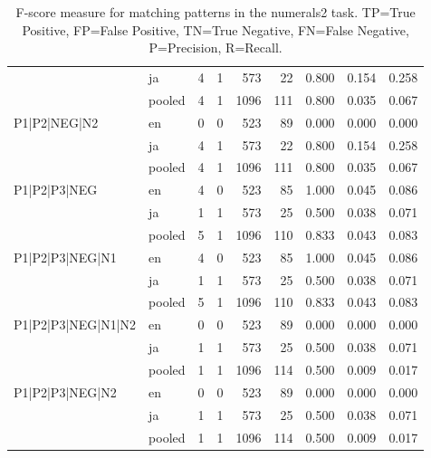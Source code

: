 \begin{table}[h!]
\begin{tabular}{llrrrrrrr}
 & ja & 4 & 1 & 573 & 22 & 0.800 & 0.154 & 0.258 \\
 & pooled & 4 & 1 & 1096 & 111 & 0.800 & 0.035 & 0.067 \\
\cline{1-9}
\multirow[t]{3}{*}{P1|P2|NEG|N2} & en & 0 & 0 & 523 & 89 & 0.000 & 0.000 & 0.000 \\
 & ja & 4 & 1 & 573 & 22 & 0.800 & 0.154 & 0.258 \\
 & pooled & 4 & 1 & 1096 & 111 & 0.800 & 0.035 & 0.067 \\
\cline{1-9}
\multirow[t]{3}{*}{P1|P2|P3|NEG} & en & 4 & 0 & 523 & 85 & 1.000 & 0.045 & 0.086 \\
 & ja & 1 & 1 & 573 & 25 & 0.500 & 0.038 & 0.071 \\
 & pooled & 5 & 1 & 1096 & 110 & 0.833 & 0.043 & 0.083 \\
\cline{1-9}
\multirow[t]{3}{*}{P1|P2|P3|NEG|N1} & en & 4 & 0 & 523 & 85 & 1.000 & 0.045 & 0.086 \\
 & ja & 1 & 1 & 573 & 25 & 0.500 & 0.038 & 0.071 \\
 & pooled & 5 & 1 & 1096 & 110 & 0.833 & 0.043 & 0.083 \\
\cline{1-9}
\multirow[t]{3}{*}{P1|P2|P3|NEG|N1|N2} & en & 0 & 0 & 523 & 89 & 0.000 & 0.000 & 0.000 \\
 & ja & 1 & 1 & 573 & 25 & 0.500 & 0.038 & 0.071 \\
 & pooled & 1 & 1 & 1096 & 114 & 0.500 & 0.009 & 0.017 \\
\cline{1-9}
\multirow[t]{3}{*}{P1|P2|P3|NEG|N2} & en & 0 & 0 & 523 & 89 & 0.000 & 0.000 & 0.000 \\
 & ja & 1 & 1 & 573 & 25 & 0.500 & 0.038 & 0.071 \\
 & pooled & 1 & 1 & 1096 & 114 & 0.500 & 0.009 & 0.017 \\
\cline{1-9}
\bottomrule
\end{tabular}
\caption{F-score measure for matching patterns in the numerals2 task. TP=True Positive, FP=False Positive, TN=True Negative, FN=False Negative, P=Precision, R=Recall.}
\label{tab:numerals2_f1}
\end{table}
